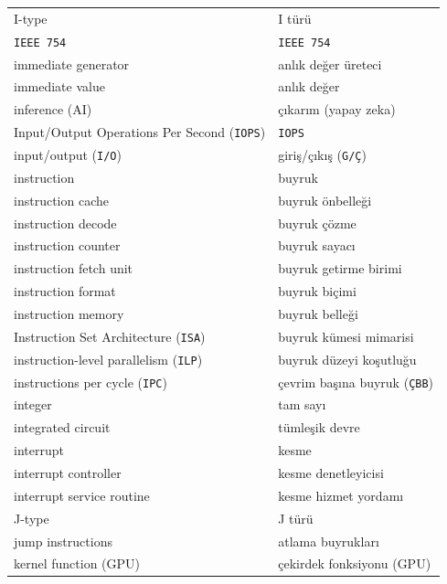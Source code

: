{\begin{longtable}{@{}p{7.6cm}p{7.6cm}@{}}
I-type & I türü \\
\texttt{IEEE 754} & \texttt{IEEE 754} \\
immediate generator & anlık değer üreteci \\
immediate value & anlık değer \\
inference (AI) & çıkarım (yapay zeka) \\
Input/Output Operations Per Second (\texttt{IOPS}) & \texttt{IOPS} \\
input/output (\texttt{I/O}) & giriş/çıkış (\texttt{G/Ç}) \\
instruction & buyruk \\
instruction cache & buyruk önbelleği \\
instruction decode & buyruk çözme \\
instruction counter & buyruk sayacı \\
instruction fetch unit & buyruk getirme birimi \\
instruction format & buyruk biçimi \\
instruction memory & buyruk belleği \\
Instruction Set Architecture (\texttt{ISA}) & buyruk kümesi mimarisi \\
instruction-level parallelism (\texttt{ILP}) & buyruk düzeyi koşutluğu \\
instructions per cycle (\texttt{IPC}) & çevrim başına buyruk (\texttt{ÇBB}) \\
integer & tam sayı \\
integrated circuit & tümleşik devre \\
interrupt & kesme \\
interrupt controller & kesme denetleyicisi \\
interrupt service routine & kesme hizmet yordamı \\

J-type & J türü \\
jump instructions & atlama buyrukları \\

kernel function (GPU) & çekirdek fonksiyonu (GPU) \\


\end{longtable}}
